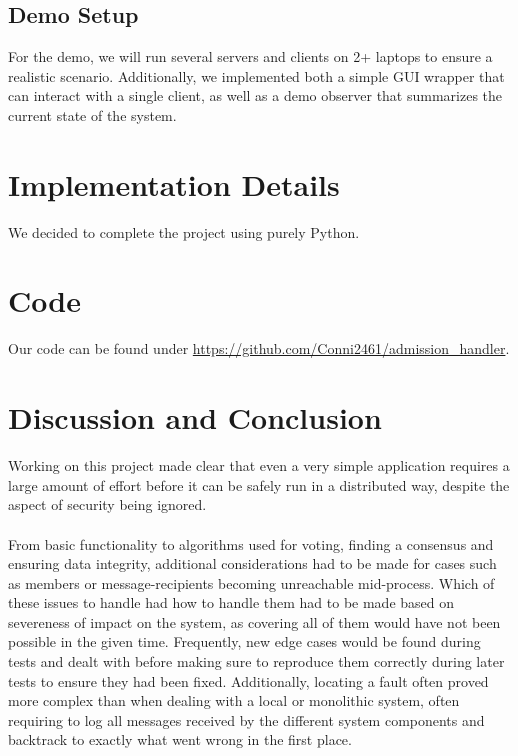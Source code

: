 \documentclass[runningheads]{llncs}
\begin{document}
\subsection{Demo Setup}
For the demo, we will run several servers and clients on 2+ laptops to ensure a realistic scenario.
Additionally, we implemented both a simple GUI wrapper that can interact with a single client, as well as a demo observer that summarizes the current state of the system.
\section{Implementation Details}
We decided to complete the project using purely Python.











\newpage
\section{Code}
Our code can be found under \url{https://github.com/Conni2461/admission_handler}.

\section{Discussion and Conclusion}
Working on this project made clear that even a very simple application requires a large amount of effort before it can be safely run in a distributed way, despite the aspect of security being ignored.
\\\\
From basic functionality to algorithms used for voting, finding a consensus and ensuring data integrity, additional considerations had to be made for cases such as members or message-recipients becoming unreachable mid-process. Which of these issues to handle had how to handle them had to be made based on severeness of impact on the system, as covering all of them would have not been possible in the given time.
Frequently, new edge cases would be found during tests and dealt with  before making sure to reproduce them correctly during later tests to ensure they had been fixed.
Additionally, locating a fault often proved more complex than when dealing with a local or monolithic system, often requiring to log all messages received by the different system components and backtrack to exactly what went wrong in the first place.
\end{document}

